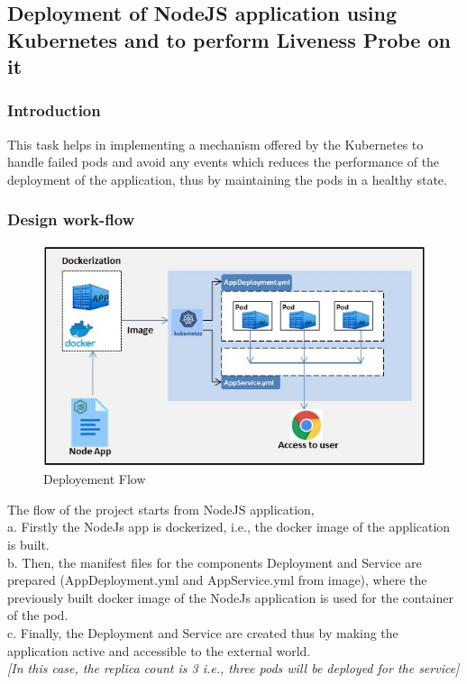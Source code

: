 \documentclass[12pt]{article}
\begin{document}
	\subsection{Deployment of NodeJS application using Kubernetes and to perform Liveness Probe on it}
	
	
	\subsubsection{Introduction}
	
This task helps in implementing a mechanism offered by the Kubernetes to handle failed pods and avoid any events which reduces the performance of the deployment of the application, thus by maintaining the pods in a healthy state.	
	
	\subsubsection{Design work-flow}

\begin{figure}[htbp]
\begin{center}
\includegraphics[width=1\textwidth]{flow1.jpg}
\end{center}
\caption{Deployement Flow}
\end{figure}

The flow of the project starts from NodeJS application, \\
a. Firstly the NodeJs app is dockerized, i.e., the docker image of the application is built. \\
b. Then, the manifest files for the components Deployment and Service are prepared (AppDeployment.yml and AppService.yml from image), where the previously built docker image of the NodeJs application is used for the container of the pod. \\
c. Finally, the Deployment and Service are created thus by making the application active and accessible to the external world.\\
 \textit{[In this case, the replica count is 3 i.e., three pods will be deployed for the service]}
\end{document}
